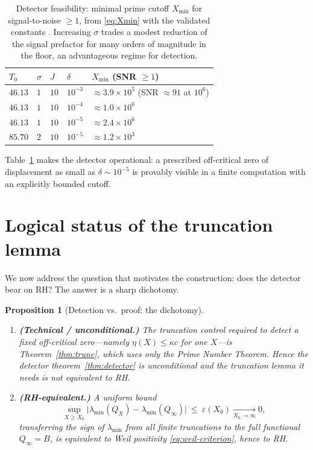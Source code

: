 \documentclass[11pt]{amsart}
\newtheorem{proposition}[theorem]{Proposition}
\theoremstyle{definition}
\theoremstyle{remark}
\newcommand{\lmin}{\lambda_{\min}}
\begin{document}
\begin{table}[ht]
\centering
\caption{Detector feasibility: minimal prime cutoff $X_{\min}$ for
signal-to-noise $\ge1$, from \eqref{eq:Xmin} with the validated constants
\cite{TrejoV8}. Increasing $\sigma$ trades a modest reduction of the signal
prefactor for many orders of magnitude in the floor, an advantageous regime
for detection.}
\label{tab:feasibility}
\begin{tabular}{@{}lllll@{}}
\toprule
$T_0$ & $\sigma$ & $J$ & $\delta$ & $X_{\min}$ (SNR $\ge1$) \\
\midrule
$46.13$ & $1$ & $10$ & $10^{-3}$ & $\approx 3.9\times10^{5}$ (SNR $\approx91$ at $10^6$) \\
$46.13$ & $1$ & $10$ & $10^{-4}$ & $\approx 1.0\times10^{6}$ \\
$46.13$ & $1$ & $10$ & $10^{-5}$ & $\approx 2.4\times10^{6}$ \\
$85.70$ & $2$ & $10$ & $10^{-5}$ & $\approx 1.2\times10^{3}$ \\
\bottomrule
\end{tabular}
\end{table}

Table~\ref{tab:feasibility} makes the detector operational: a prescribed
off-critical zero of displacement as small as $\delta\sim10^{-5}$ is
provably visible in a finite computation with an explicitly bounded cutoff.

\section{Logical status of the truncation lemma}\label{sec:dichotomy}

We now address the question that motivates the construction: does the
detector bear on RH? The answer is a sharp dichotomy.

\begin{proposition}[Detection vs.\ proof: the dichotomy]\label{prop:dichotomy}
\leavevmode
\begin{enumerate}[label=\textup{(\alph*)}]
\item \textbf{(Technical / unconditional.)} The truncation control required to
detect a \emph{fixed} off-critical zero---namely $\eta(X)\le\kappa c$ for one
$X$---is Theorem~\ref{thm:trunc}, which uses only the Prime Number Theorem.
Hence the detector theorem~\ref{thm:detector} is unconditional and the
truncation lemma it needs is \emph{not} equivalent to RH.
\item \textbf{(RH-equivalent.)} A \emph{uniform} bound
\begin{equation}\label{eq:uniform}
  \sup_{X\ge X_0}\bigl|\lmin(Q_X)-\lmin(Q_\infty)\bigr|\ \le\ \varepsilon(X_0)\xrightarrow[X_0\to\infty]{}0,
\end{equation}
transferring the sign of $\lmin$ from all finite truncations to the full
functional $Q_\infty=B$, is equivalent to Weil positivity \eqref{eq:weil-criterion},
hence to RH.
\end{enumerate}
\end{proposition}
\end{document}
